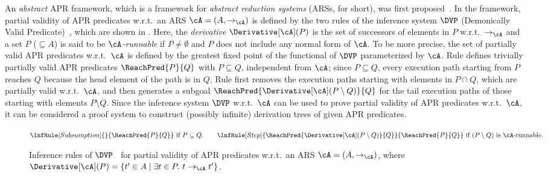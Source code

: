 An \emph{abstract} APR framework, which is a framework for \emph{abstract reduction systems} (ARSs, for short), was first proposed~\cite{CL18}.
In the framework, partial validity of APR predicates w.r.t.\ an ARS $\cA=(A,\to_\cA)$ is defined by the two rules of the inference system $\DVP$ (Demonically Valid Predicate)~\cite{CL18},
which are shown in .
Here, the \emph{derivative} $\Derivative[\cA](P)$ is the set of successors of elements in $P$ w.r.t.\ $\to_\cA$ and a set $P$ ($\subseteq A$) is said to be \emph{$\cA$-runnable} if $P\ne \emptyset$ and $P$ does not include any normal form of $\cA$.
To be more precise, the set of partially valid APR predicates w.r.t.\ $\cA$ is defined by the greatest fixed point of the functional of $\DVP$ parameterized by $\cA$.
Rule  defines trivially partially valid APR predicates $\ReachPred{P}{Q}$ with $P \subseteq Q$, independent from $\cA$; since $P \subseteq Q$, every execution path starting from $P$ reaches $Q$ because the head element of the path is in $Q$.
Rule  first removes the execution paths starting with elements in $P\cap Q$, which are partially valid w.r.t.\ $\cA$, and then generates a subgoal $\ReachPred{\Derivative[\cA](P\setminus Q)}{Q}$ for the tail execution paths of those starting with elements $P\setminus Q$.
Since the inference system $\DVP$ w.r.t.\ $\cA$ can be used to prove partial validity of APR predicates w.r.t.\ $\cA$, it can be considered a proof system to construct (possibly infinite) derivation trees of given APR predicates.

\begin{figure}[t]
	\centering
	$
		\InfRule[Subsumption]{}{\ReachPred{P}{Q}
		}
		~\mbox{if $P \subseteq Q$.}
		\qquad
		\InfRule[Step]{\ReachPred{\Derivative[\cA](P\setminus Q)}{Q}
		}{\ReachPred{P}{Q}}
		~\mbox{if
			$(P \setminus Q)$ is $\cA$-runnable.
		}
	$
	\caption{Inference rules of $\DVP$~\cite{CL18} for partial validity of APR predicates w.r.t.\ an ARS $\cA=(A,\to_{\cA})$, where
		$\Derivative[\cA](P) = \{ t' \in A \mid \exists t \in P.\ t \to_{\cA} t' \}$.
	}
	\label{fig:rules-of-DVP}
\end{figure}

